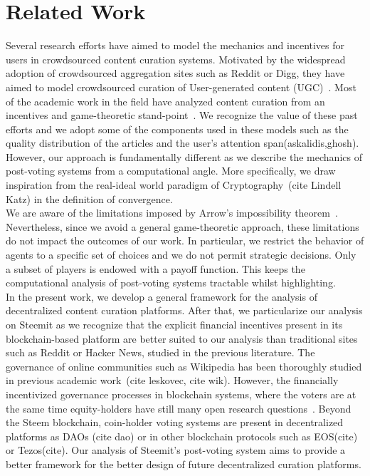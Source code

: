 \section{Related Work}
  Several research efforts have aimed to model the mechanics and incentives for users in crowdsourced content curation systems. Motivated by the widespread adoption of crowdsourced aggregation sites such as Reddit or Digg, they have aimed to model crowdsourced curation of User-generated content (UGC)~\cite{askalidis2013theoretical}. Most of the academic work in the field have analyzed content curation from an incentives and game-theoretic stand-point~\cite{ghosh2011incentivizing,das2010ranking,gupte2009news}. We recognize the value of these past efforts and we adopt some of the components used in these models such as the quality distribution of the articles and the user's attention span(askalidis,ghosh). However, our approach is fundamentally different as we describe the mechanics of post-voting systems from a computational angle. More specifically, we draw inspiration from the real-ideal world paradigm of Cryptography~\cite{rationalprotocol}(cite Lindell Katz) in the definition of convergence.\\
  
  We are aware of the limitations imposed by Arrow's impossibility theorem~\cite{arrow1950difficulty}. Nevertheless, since we avoid a general game-theoretic approach, these limitations do not impact the outcomes of our work. In particular, we restrict the behavior of agents to a specific set of choices and we do not permit strategic decisions. Only a subset of players is endowed with a payoff function. This keeps the computational analysis of post-voting systems tractable whilst highlighting.\\

  
  In the present work, we develop a general framework for the analysis of decentralized content curation platforms. After that, we particularize our analysis on Steemit as we recognize that the explicit financial incentives present in its blockchain-based platform are better suited to our analysis than traditional sites such as Reddit or Hacker News, studied in the previous literature. The governance of online communities such as Wikipedia has been thoroughly studied in previous academic work~\cite{leskovec2010governance,forte2008scaling}(cite leskovec, cite wik). However, the financially incentivized governance processes in blockchain systems, where the voters are at the same time equity-holders have still many open research questions~\cite{vitalik, ehrsam}. Beyond the Steem blockchain, coin-holder voting systems are present in decentralized platforms as DAOs (cite dao) or in other blockchain protocols such as EOS(cite) or Tezos(cite). Our analysis of Steemit's post-voting system aims to provide a better framework for the better design of future decentralized curation platforms.
  
  
